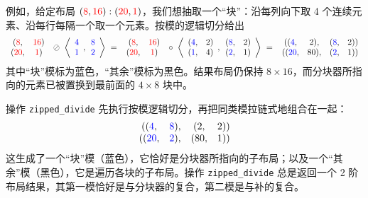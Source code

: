 例如，给定布局 $(\textcolor{red}{8},\textcolor{red}{16}):(\textcolor{red}{20},\textcolor{red}{1})$，我们想抽取一个“块”：沿每列向下取 4 个连续元素、沿每行每隔一个取一个元素。按模的逻辑切分给出
\begin{align*}
\begin{array}{cc} (\textcolor{red}{8}, & \textcolor{red}{16})\\
                  (\textcolor{red}{20},& \textcolor{red}{1}) \end{array}
\ \oslash \
\left\langle
\begin{array}{c} \textcolor{blue}{4} \\ \textcolor{blue}{1} \end{array},
\begin{array}{c} \textcolor{blue}{8} \\ \textcolor{blue}{2} \end{array}
\right\rangle
\ = \
\begin{array}{cc} (\textcolor{red}{8}, & \textcolor{red}{16}) \\ (\textcolor{red}{20}, & \textcolor{red}{1}) \end{array}
\ \circ \
\left\langle
\begin{array}{cc} (\textcolor{blue}{4}, & \textcolor{black}{2}) \\ (\textcolor{blue}{1}, & \textcolor{black}{4}) \end{array},
\begin{array}{cc} (\textcolor{blue}{8}, & \textcolor{black}{2}) \\ (\textcolor{blue}{2}, & \textcolor{black}{1}) \end{array}
\right\rangle
\ = \
\begin{array}{cccc}((\textcolor{blue}{4}, & \textcolor{black}{2}), & (\textcolor{blue}{8}, & \textcolor{black}{2})) \\ ((\textcolor{blue}{20}, & \textcolor{black}{80}), & (\textcolor{blue}{2}, & \textcolor{black}{1})) \end{array}
\end{align*}
其中“块”模标为蓝色，“其余”模标为黑色。结果布局仍保持 $8 {\times} 16$，而分块器所指向的元素已被置换到最前面的 $4 {\times} 8$ 块中。

操作 {\tt zipped\_divide} 先执行按模逻辑切分，再把同类模拉链式地组合在一起：
\begin{align*}
\begin{array}{cccc}((\textcolor{blue}{4}, & \textcolor{blue}{8}), & (\textcolor{black}{2}, & \textcolor{black}{2})) \\ ((\textcolor{blue}{20}, & \textcolor{blue}{2}), & (\textcolor{black}{80}, & \textcolor{black}{1})) \end{array}
\end{align*}
这生成了一个“块”模（蓝色），它恰好是分块器所指向的子布局；以及一个“其余”模（黑色），它是遍历各块的子布局。操作 {\tt zipped\_divide} 总是返回一个 2 阶布局结果，其第一模恰好是与分块器的复合，第二模是与补的复合。

